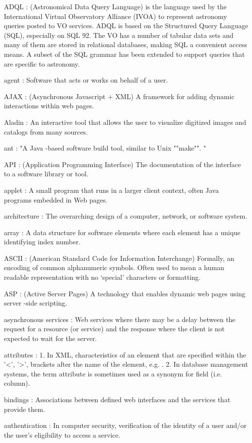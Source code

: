 
\newcommand{\glossitem}[2]
{
\item{#1} :  {#2}
}



\glossitem{ADQL}{(Astronomical Data Query Language) is the language used by the International Virtual Observatory Alliance (IVOA) to represent astronomy queries posted to VO services. ADQL is based on the Structured Query Language (SQL), especially on SQL 92. The VO has a number of tabular data sets and many of them are stored in relational databases, making SQL a convenient access means. A subset of the SQL grammar has been extended to support queries that are specific to astronomy.}
\glossitem{agent}{Software that acts or works on behalf of a user.}
\glossitem{AJAX}{(Asynchronous Javascript + XML) A framework for adding dynamic interactions within web pages.}
\glossitem{Aladin}{An interactive tool that allows the user to visualize digitized images and catalogs from many sources.}
\glossitem{ant}{"A Java -based software build tool, similar to Unix ""make"". "}
\glossitem{API}{(Application Programming Interface) The documentation of the interface to a software library or tool.}
\glossitem{applet}{A small program that runs in a larger client context, often Java programs embedded in Web pages.}
\glossitem{architecture}{The overarching design of a computer, network, or software system.}
\glossitem{array}{A data structure for software elements where each element has a unique identifying index number.}
\glossitem{ASCII}{(American Standard Code for Information Interchange) Formally, an encoding of common alphanumeric symbols. Often used to mean a human readable representation with no ‘special’ characters or formatting.}
\glossitem{ASP}{(Active Server Pages) A technology that enables dynamic web pages using server -side scripting.}
\glossitem{asynchronous services}{Web services where there may be a delay between the request for a resource (or service) and the response where the client is not expected to wait for the server.}
\glossitem{attributes}{1. In XML, characteristics of an element that are specified within the '<', '>', brackets after the name of the element, e.g. . 
2. In database management systems, the term attribute is sometimes used as a synonym for field (i.e. column).}
\glossitem{bindings}{Associations between defined web interfaces and the services that provide them.}
\glossitem{authentication}{In computer security, verification of the identity of a user and/or the user's eligibility to access a service.}
